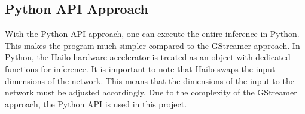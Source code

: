 \subsection{Python API Approach}

With the Python API approach, one can execute the entire inference in Python.  
This makes the program much simpler compared to the GStreamer approach.  
In Python, the Hailo hardware accelerator is treated as an object with dedicated functions for inference.  
It is important to note that Hailo swaps the input dimensions of the network.  
This means that the dimensions of the input to the network must be adjusted accordingly.  
Due to the complexity of the GStreamer approach, the Python API is used in this project.